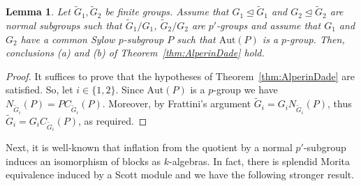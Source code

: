 \documentclass[12pt,a4paper]{amsart}
\theoremstyle{plain}\newtheorem{Theorem}{Theorem}[section]
\theoremstyle{plain}\newtheorem{Conjecture}[Theorem]{Conjecture}
\theoremstyle{plain}\newtheorem{Corollary}[Theorem]{Corollary}
\theoremstyle{plain}\newtheorem{Lemma}[Theorem]{Lemma}
\theoremstyle{plain}\newtheorem{Proposition}[Theorem]{Proposition}
\theoremstyle{definition}\newtheorem{Definition}[Theorem]{Definition}
\theoremstyle{definition}\newtheorem{Example}[Theorem]{Example}
\theoremstyle{definition}\newtheorem{Examples}[Theorem]{Examples}
\theoremstyle{definition}\newtheorem{Remark}[Theorem]{Remark}
\theoremstyle{definition}\newtheorem{Question}[Theorem]{Question}
\theoremstyle{definition}\newtheorem{Notation}[Theorem]{Notation}
\theoremstyle{definition}\newtheorem{Hypothesis}[Theorem]{Hypothesis}
\theoremstyle{definition}\newtheorem{Assumption}[Theorem]{Assumption}
\theoremstyle{definition}\newtheorem{Strategy}[Theorem]{Strategy}
\theoremstyle{definition}\newtheorem{Contents}[Theorem]{Contents}
\theoremstyle{definition}\newtheorem{Computations}[Theorem]{Computations}
\theoremstyle{definition}\newtheorem{Equivalences}[Theorem]{Equivalences}
\theoremstyle{definition}\newtheorem{Notation/Definition}[Theorem]{Notation/Definition}
\theoremstyle{definition}\newtheorem{noth}[Theorem]{}
\theoremstyle{plain}\newtheorem{Step}[Theorem]{Step}
\def\Aut{\mathrm{Aut}}
\begin{document}
\begin{Lemma}\label{lem:Aut(P)} 
Let $\widetilde{G}_{1}, \widetilde{G}_{2}$ be finite groups. Assume that 
$G_{1}\unlhd \widetilde G_{1}$ and  $G_{2}\unlhd \widetilde G_{2}$ are normal subgroups 
such that  $\widetilde{G}_{1}/G_{1}$, $\widetilde{G}_{2}/G_{2}$ are $p'$-groups 
and assume that $G_{1}$ and $G_{2}$ have a common Sylow $p$-subgroup  
$P$  such that 
$\Aut(P)$ is a $p$-group. 
Then, conclusions {\rm(a)} and {\rm(b)} of Theorem~\ref{thm:AlperinDade} hold. 
\end{Lemma}
%
\begin{proof}
It suffices to prove that the hypotheses of Theorem~\ref{thm:AlperinDade} are satisfied. So, let $i\in\{1,2\}$.
Since $\Aut(P)$ is a $p$-group we have  $N_{\widetilde G_{i}}(P)=PC_{\widetilde G_{i}}(P)$.
Moreover, by Frattini's argument
$\widetilde G_{i}=G_{i}N_{\widetilde G_{i}}(P)$, thus 
$\widetilde G_{i}=G_{i}C_{\widetilde G_{i}}(P)$, as required.
\end{proof}


Next, it is well-known that inflation from the quotient by a normal $p'$-subgroup induces an isomorphism of blocks as $k$-algebras.  In fact, there is splendid Morita equivalence induced by a Scott module and we have the following stronger result.
\end{document}

